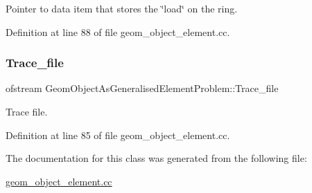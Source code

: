 Pointer to data item that stores the \char`\"{}load\char`\"{} on the ring. 



Definition at line 88 of file geom\+\_\+object\+\_\+element.\+cc.

\mbox{\label{classGeomObjectAsGeneralisedElementProblem_ad6261e556a52596ba8904ee902ea6d70}} 
\subsubsection{\texorpdfstring{Trace\+\_\+file}{Trace\_file}}
{\footnotesize\ttfamily ofstream Geom\+Object\+As\+Generalised\+Element\+Problem\+::\+Trace\+\_\+file\hspace{0.3cm}{\ttfamily [private]}}



Trace file. 



Definition at line 85 of file geom\+\_\+object\+\_\+element.\+cc.



The documentation for this class was generated from the following file\+:\begin{DoxyCompactItemize}
\item 
\hyperlink{geom__object__element_8cc}{geom\+\_\+object\+\_\+element.\+cc}\end{DoxyCompactItemize}
